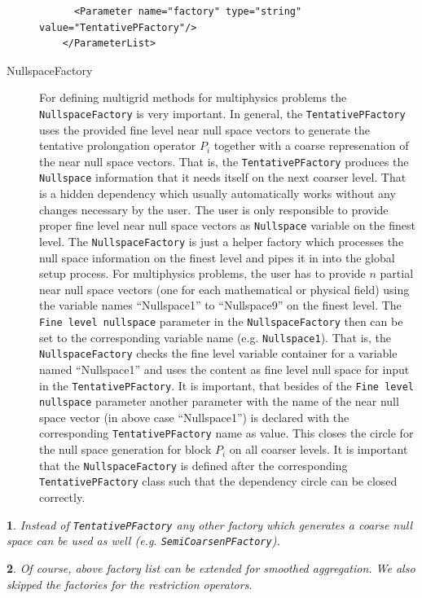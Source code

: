 \documentclass[10pt,fleqn]{book}
\newtheorem*{mycomment}{\ding{42}}
\begin{document}
\begin{description}
\begin{lstlisting}
      <Parameter name="factory" type="string" value="TentativePFactory"/>
    </ParameterList>
\end{lstlisting}
\item[NullspaceFactory] For defining multigrid methods for multiphysics problems the \texttt{NullspaceFactory} is very important. In general, the \texttt{TentativePFactory} uses the provided fine level near null space vectors to generate the tentative prolongation operator $P_i$ together with a coarse represenation of the near null space vectors. That is, the \texttt{TentativePFactory} produces the \texttt{Nullspace} information that it needs itself on the next coarser level. That is a hidden dependency which usually automatically works without any changes necessary by the user. The user is only responsible to provide proper fine level near null space vectors as \texttt{Nullspace} variable on the finest level.
The \texttt{NullspaceFactory} is just a helper factory which processes the null space information on the finest level and pipes it in into the global setup process. For multiphysics problems, the user has to provide $n$ partial near null space vectors (one for each mathematical or physical field) using the variable names ``Nullspace1'' to ``Nullspace9'' on the finest level. The \texttt{Fine level nullspace} parameter in the \texttt{NullspaceFactory} then can be set to the corresponding variable name (e.g. \texttt{Nullspace1}). That is, the \texttt{NullspaceFactory} checks the fine level variable container for a variable named ``Nullspace1'' and uses the content as fine level null space for input in the \texttt{TentativePFactory}. It is important, that besides of the \texttt{Fine level nullspace} parameter another parameter with the name of the near null space vector (in above case ``Nullspace1'') is declared with the corresponding \texttt{TentativePFactory} name as value. This closes the circle for the null space generation for block $P_i$ on all coarser levels.
It is important that the \texttt{NullspaceFactory} is defined after the corresponding \texttt{TentativePFactory} class such that the dependency circle can be closed correctly.
\end{description}
\begin{mycomment}
Instead of \texttt{TentativePFactory} any other factory which generates a coarse null space can be used as well (e.g. \texttt{SemiCoarsenPFactory}).
\end{mycomment}
\begin{mycomment}
Of course, above factory list can be extended for smoothed aggregation. We also skipped the factories for the restriction operators.
\end{mycomment}
\end{document}

